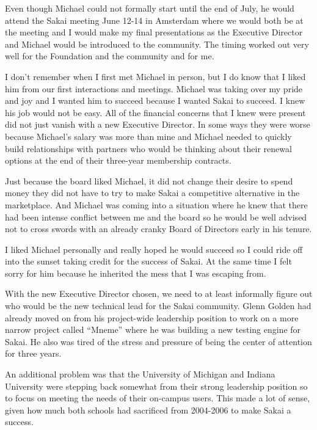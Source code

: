 \documentclass[12pt]{book}
\begin{document}

Even though Michael could not formally start until the end of July, he would attend the Sakai
meeting June 12-14 in Amsterdam where we would both be at the meeting and I would make my final presentations
as the Executive Director and Michael would be introduced to the community.  The timing worked
out very well for the Foundation and the community and for me.

I don't remember when I first met Michael in person, but I do know that I liked him from our
first interactions and meetings.  Michael was taking over my pride and joy and I
wanted him to succeed because I wanted Sakai to succeed.  I knew his job would not be easy.
All of the financial concerns that I knew were present did not just vanish with a new
Executive Director.
In some ways they were worse because Michael's salary was more than mine and Michael needed
to quickly build relationships with partners who would be thinking about their renewal options
at the end of their three-year membership contracts.

Just because the board liked Michael, it did not change their desire
to spend money they did not have to try to make Sakai a competitive alternative
in the marketplace.   And Michael was coming into a situation where he knew that there had
been intense conflict between me and the board so he would be well advised not to cross
swords with an already cranky Board of Directors early in his tenure.

I liked Michael personally and really hoped he would succeed so I could ride off
into the sunset taking credit for the success of Sakai.  At the same time I felt sorry for
him because he inherited the mess that I was escaping from.

With the new Executive Director chosen, we need to at least informally
figure out who would be the new technical lead for the Sakai community.
Glenn Golden had already moved on from his project-wide leadership position to
work on a more narrow project called ``Mneme'' where he was building a
new testing engine for Sakai.  He also was tired of the stress and pressure of
being the center of attention for three years.

An additional problem was that the University of Michigan and Indiana University were
stepping back somewhat from their strong leadership position so to focus on meeting
the needs of their on-campus users.  This made a lot of sense, given how much both schools
had sacrificed from 2004-2006 to make Sakai a success.
\end{document}

